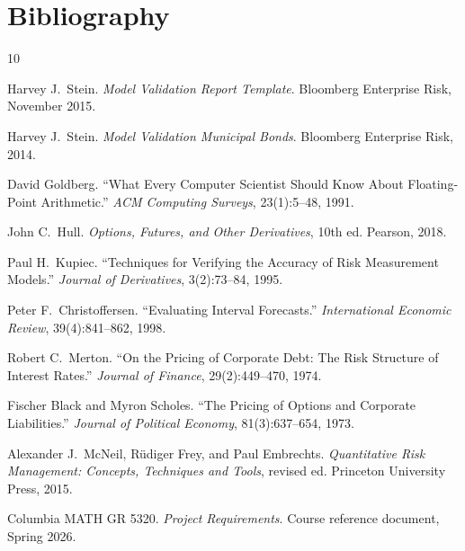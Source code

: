 \documentclass[11pt]{article}
\begin{document}
\section{Bibliography}

\begin{thebibliography}{10}

Harvey J.\ Stein.
\textit{Model Validation Report Template}.
Bloomberg Enterprise Risk, November 2015.

Harvey J.\ Stein.
\textit{Model Validation Municipal Bonds}.
Bloomberg Enterprise Risk, 2014.

David Goldberg.
``What Every Computer Scientist Should Know About Floating-Point Arithmetic.''
\textit{ACM Computing Surveys}, 23(1):5--48, 1991.

John C.\ Hull.
\textit{Options, Futures, and Other Derivatives}, 10th ed.
Pearson, 2018.

Paul H.\ Kupiec.
``Techniques for Verifying the Accuracy of Risk Measurement Models.''
\textit{Journal of Derivatives}, 3(2):73--84, 1995.

Peter F.\ Christoffersen.
``Evaluating Interval Forecasts.''
\textit{International Economic Review}, 39(4):841--862, 1998.

Robert C.\ Merton.
``On the Pricing of Corporate Debt: The Risk Structure of Interest Rates.''
\textit{Journal of Finance}, 29(2):449--470, 1974.

Fischer Black and Myron Scholes.
``The Pricing of Options and Corporate Liabilities.''
\textit{Journal of Political Economy}, 81(3):637--654, 1973.

Alexander J.\ McNeil, R\"{u}diger Frey, and Paul Embrechts.
\textit{Quantitative Risk Management: Concepts, Techniques and Tools},
revised ed.
Princeton University Press, 2015.

Columbia MATH GR 5320.
\textit{Project Requirements}.
Course reference document, Spring 2026.

\end{thebibliography}
\end{document}
